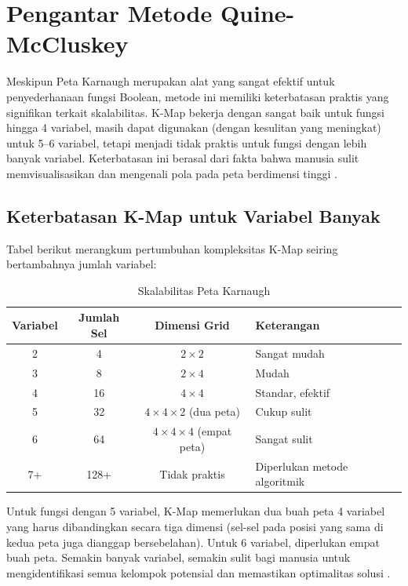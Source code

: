 \section{Pengantar Metode Quine-McCluskey}

Meskipun Peta Karnaugh merupakan alat yang sangat efektif untuk penyederhanaan fungsi Boolean, metode ini memiliki keterbatasan praktis yang signifikan terkait skalabilitas. K-Map bekerja dengan sangat baik untuk fungsi hingga 4 variabel, masih dapat digunakan (dengan kesulitan yang meningkat) untuk 5--6 variabel, tetapi menjadi tidak praktis untuk fungsi dengan lebih banyak variabel. Keterbatasan ini berasal dari fakta bahwa manusia sulit memvisualisasikan dan mengenali pola pada peta berdimensi tinggi \cite{rosen2019}.

\subsection{Keterbatasan K-Map untuk Variabel Banyak}

Tabel berikut merangkum pertumbuhan kompleksitas K-Map seiring bertambahnya jumlah variabel:

\begin{table}[htbp]
\centering
\renewcommand{\arraystretch}{1.3}
\begin{tabular}{|c|c|c|l|}
\hline
\textbf{Variabel} & \textbf{Jumlah Sel} & \textbf{Dimensi Grid} & \textbf{Keterangan} \\ \hline
2 & 4 & $2 \times 2$ & Sangat mudah \\ \hline
3 & 8 & $2 \times 4$ & Mudah \\ \hline
4 & 16 & $4 \times 4$ & Standar, efektif \\ \hline
5 & 32 & $4 \times 4 \times 2$ (dua peta) & Cukup sulit \\ \hline
6 & 64 & $4 \times 4 \times 4$ (empat peta) & Sangat sulit \\ \hline
7+ & 128+ & Tidak praktis & Diperlukan metode algoritmik \\ \hline
\end{tabular}
\caption{Skalabilitas Peta Karnaugh}
\label{tab:skalabilitas-kmap}
\end{table}

Untuk fungsi dengan 5 variabel, K-Map memerlukan dua buah peta 4 variabel yang harus dibandingkan secara tiga dimensi (sel-sel pada posisi yang sama di kedua peta juga dianggap bersebelahan). Untuk 6 variabel, diperlukan empat buah peta. Semakin banyak variabel, semakin sulit bagi manusia untuk mengidentifikasi semua kelompok potensial dan memastikan optimalitas solusi \cite{wiki_karnaugh}.

